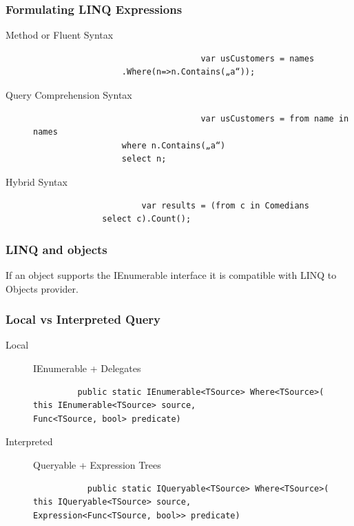 \documentclass[a4paper,10pt]{scrartcl}
\begin{document}
\subsubsection{Formulating LINQ Expressions}
\begin{description}
 \item [Method or Fluent Syntax] \begin{lstlisting}
                                  var usCustomers = names
				  .Where(n=>n.Contains(„a“));

                                 \end{lstlisting}
\item[Query Comprehension Syntax]\begin{lstlisting}
                                  var usCustomers = from name in names
				  where n.Contains(„a“)
				  select n;

                                 \end{lstlisting}
\item[Hybrid Syntax] \begin{lstlisting}
                      var results = (from c in Comedians
		      select c).Count();
                     \end{lstlisting}


\end{description}

\subsubsection{LINQ and objects}

If an object supports the IEnumerable interface it is compatible with LINQ to Objects provider.

\subsubsection{Local vs Interpreted Query}
\begin{description}
 \item [Local] IEnumerable + Delegates
		\begin{lstlisting}
		 public static IEnumerable<TSource> Where<TSource>(
this IEnumerable<TSource> source,
Func<TSource, bool> predicate)

		\end{lstlisting}
\item[Interpreted] Queryable + Expression Trees
		  \begin{lstlisting}
		   public static IQueryable<TSource> Where<TSource>(
this IQueryable<TSource> source,
Expression<Func<TSource, bool>> predicate)

		  \end{lstlisting}


\end{description}
\end{document}

